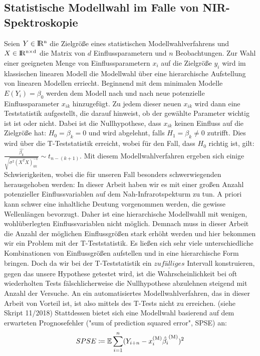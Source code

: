 	\subsection{Statistische Modellwahl im Falle von NIR-Spektroskopie}
	\label{ssec:mlr}
	Seien $Y\in \rm I\!R^{n}$ die Zielgröße eines statistischen Modellwahlverfahrens und $X \in \rm I\!R^{n \times d}$ die Matrix von $d$ Einflussparametern und $n$ Beobachtungen.
	Zur Wahl einer geeigneten Menge von Einflussparametern $x_i$ auf die Zielgröße $y_i$  wird im klassischen linearen Modell die Modellwahl über eine hierarchische Aufstellung von linearen Modellen erriecht.
	Beginnend mit dem minimalen Modelle $E(Y_i) = \beta_0$ werden dem Modell nach und nach neue potenzielle Einflussparameter $x_{ik}$ hinzugefügt.
	Zu jedem dieser neuen $x_{ik}$ wird dann eine Teststatistik aufgestellt, die darauf hinweist, ob der gewählte Parameter wichtig ist ist oder nicht.
	Dabei ist die Nullhypothese, dass $x_{ik}$ keinen Einfluss auf die Zielgröße hat: $ H_0 = \beta_k = 0$ und wird abgelehnt, falls $H_1 = \beta_k \neq 0$ zutrifft.
	Dies wird über die T-Teststatistik erreicht,  wobei für den Fall, dass $H_0$ richtig ist, gilt: $\frac{\hat{\beta_k}}{\sqrt{\sigma^2(X^TX)^{-1}_{kk}}} \sim t_{n-(k+1)}$.
	Mit diesem Modellwahlverfahren ergeben sich einige Schwierigkeiten, wobei die für unseren Fall besonders schwerwiegenden herausgehoben werden: In dieser Arbeit haben wir es mit einer großen Anzahl potenzieller Einflussvariablen auf dem Nah-Infrarotspekturm zu tun.
	A priori kann schwer eine inhaltliche Deutung vorgenommen werden, die gewisse Wellenlängen bevorzugt. Daher ist eine hierarchische Modellwahll mit wenigen, wohlüberlegten Einflussvariablen nicht möglich.
	Demnach muss in dieser Arbeit die Anzahl der möglichen Einflussgrößen stark erhöht werden und hier bekommen wir ein Problem mit der T-Teststatistik.
	Es ließen sich sehr viele unterschiedliche Kombinationen von Einflussgrößen aufstellen und in eine hierarchische Form bringen.
	Doch da wir bei der T-Teststatistik ein $\underline{zufälliges}$ Intervall konstruieren, gegen das unsere Hypothese getestet wird, ist die Wahrscheinlichkeit bei oft wiederholten Tests fälschlicherweise die Nullhypothese abzulehnen steigend mit Anzahl der Versuche.
	An ein automatisiertes Modellwahlverfahren, das in dieser Arbeit von Vorteil ist, ist also mittels des T-Tests nicht zu erreichen. (siehe Skript 11/2018)
	Stattdessen bietet sich eine Modellwahl basierend auf dem erwarteten Prognosefehler ("sum of prediction squared error", SPSE) an:
	\[
		SPSE \coloneqq \operatorname{\mathbb{E}} \sum_{i=1}^{n} (Y_{i+n} - x_{i}^{\mathrm{(M)}}\hat{\beta_i}^{\mathrm{(M)}})^2
	\]

